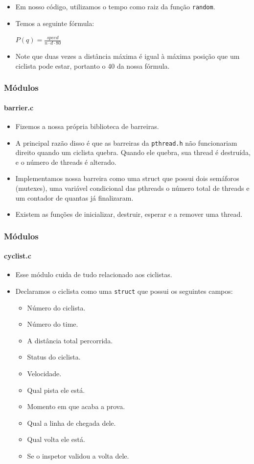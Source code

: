 \documentclass{beamer}
\begin{document}
\begin{frame}
	\begin{itemize}
		\item Em nosso código, utilizamos o tempo como raiz da função \texttt{random}.
		\item Temos a seguinte fórmula:
		\begin{center} 
			$P(q) = \frac{speed}{n \cdot d \cdot 80}$
		\end{center}
		\item Note que duas vezes a distância máxima é igual à máxima posição que um ciclista pode estar, portanto o 40 da nossa fórmula.
	\end{itemize}
\end{frame}

\begin{frame}
	\frametitle{Módulos}
	\framesubtitle{barrier.c}
	\begin{itemize}
		\item Fizemos a nossa própria biblioteca de barreiras. 
		\item A principal razão disso é que as barreiras da \texttt{pthread.h} não funcionariam direito quando um ciclista quebra. Quando ele quebra, sua thread é destruída, e o número de threads é alterado.
		\item Implementamos nossa barreira como uma struct que possui dois semáforos (mutexes), uma variável condicional das pthreads o número total de threads e um contador de quantas já finalizaram.
		\item Existem as funções de inicializar, destruir, esperar e a remover uma thread.
	\end{itemize}
\end{frame}

\begin{frame}
	\frametitle{Módulos}
	\framesubtitle{cyclist.c}
	\begin{itemize}
		\item Esse módulo cuida de tudo relacionado aos ciclistas.
		\item Declaramos o ciclista como uma
		\texttt{struct} que possui os seguintes campos:
		\begin{itemize}
			\item Número do ciclista.
			\item Número do time.
			\item A distância total percorrida.
			\item Status do ciclista.         
			\item Velocidade.
			\item Qual pista ele está.
			\item Momento em que acaba a prova.
			\item Qual a linha de chegada dele.    
			\item Qual volta ele está.     
			\item Se o inspetor validou a volta dele.
		\end{itemize}
	\end{itemize}	
\end{frame}
\end{document}
